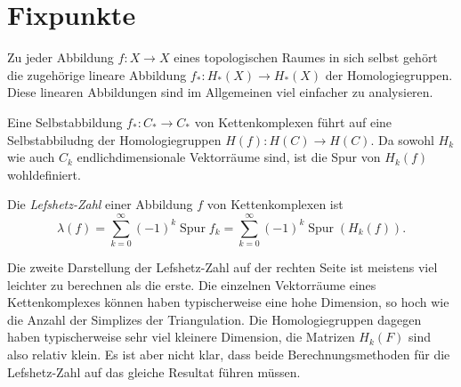 %
%
%
\section{Fixpunkte
\label{buch:section:fixpunkte}}
Zu jeder Abbildung $f\colon X\to X$ eines topologischen Raumes in sich
selbst gehört die zugehörige lineare Abbildung $f_*\colon H_*(X)\to H_*(X)$
der Homologiegruppen.
Diese linearen Abbildungen sind im Allgemeinen viel einfacher zu
analysieren.

%

Eine Selbstabbildung $f_*\colon C_*\to C_*$ von Kettenkomplexen führt auf
eine Selbstabbiludng der Homologiegruppen $H(f)\colon H(C)\to H(C)$.
Da sowohl $H_k$ wie auch $C_k$ endlichdimensionale Vektorräume sind, 
ist die Spur von $H_k(f)$ wohldefiniert.

\begin{definition}
Die {\em Lefshetz-Zahl} einer Abbildung $f$ von Kettenkomplexen ist
\[
\lambda(f)
=
\sum_{k=0}^\infty
(-1)^k \operatorname{Spur}f_k
=
\sum_{k=0}^\infty 
(-1)^k \operatorname{Spur}(H_k(f)).
\]
\end{definition}

Die zweite Darstellung  der Lefshetz-Zahl auf der rechten Seite ist
meistens viel leichter zu berechnen als die erste.
Die einzelnen Vektorräume eines Kettenkomplexes können haben typischerweise
eine hohe Dimension, so hoch wie die Anzahl der Simplizes der Triangulation.
Die Homologiegruppen dagegen haben typischerweise sehr viel kleinere 
Dimension, die Matrizen $H_k(F)$ sind also relativ klein.
Es ist aber nicht klar, dass beide Berechnungsmethoden für die 
Lefshetz-Zahl auf das gleiche Resultat führen müssen.

